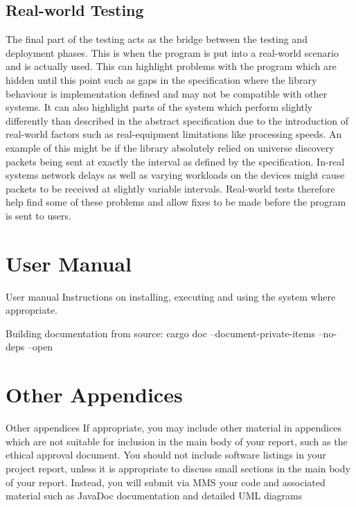 \documentclass[11pt,a4paper]{report}
\begin{document}
	\subsection{Real-world Testing}
	The final part of the testing acts as the bridge between the testing and deployment phases. This is when the program is put into a real-world scenario and is actually used. This can highlight problems with the program which are hidden until this point such as gaps in the specification where the library behaviour is implementation defined and may not be compatible with other systems. It can also highlight parts of the system which perform slightly differently than described in the abstract specification due to the introduction of real-world factors such as real-equipment limitations like processing speeds. An example of this might be if the library absolutely relied on universe discovery packets being sent at exactly the interval as defined by the specification. In-real systems network delays as well as varying workloads on the devices might cause packets to be received at slightly variable intervals. Real-world tests therefore help find some of these problems and allow fixes to be made before the program is sent to users.
	
	
	\section{User Manual}
	User manual Instructions on installing, executing and using the
	system where appropriate.
	
	Building documentation from source:
	cargo doc --document-private-items --no-deps --open
	
	\section{Other Appendices}
	Other
	appendices
	If appropriate, you may include other material in
	appendices which are not suitable for inclusion in the
	main body of your report, such as the ethical approval
	document.
	You should not include software listings in your project report, unless it is
	appropriate to discuss small sections in the main body of your report. Instead,
	you will submit via MMS your code and associated material such as JavaDoc
	documentation and detailed UML diagrams
	
\end{document}
